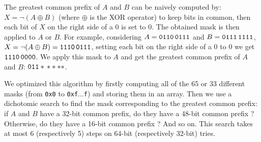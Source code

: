 \documentclass[a4paper,11pt]{article}
\begin{document}
The greatest common prefix of $A$ and $B$ can be naively computed by:
$X = \lnot (A \oplus B)$ (where $\oplus$ is the XOR operator) to keep bits in
common, then each bit of $X$ on the right side of a 0 is set to 0. The obtained
mask is then applied to $A$ or $B$. For example, considering
$A = {\tt 0110\,0111}$ and $B = {\tt 0111\,1111}$,
$X = \lnot (A \oplus B) = {\tt 1110\,0111}$, setting each bit on the right side
of a 0 to 0 we get ${\tt 1110\,0000}$. We apply this mask to $A$ and get the
greatest common prefix of $A$ and $B$: ${\tt 011*\,****}$.


We optimized this algorithm by firstly computing all of the 65 or 33 different
masks (from {\tt 0x0} to {\tt0xf$\dots$f}) and storing them in an array. Then we
use a dichotomic search to find the mask corresponding to the greatest common
prefix: if $A$ and $B$ have a 32-bit common prefix, do they have a 48-bit common
prefix ? Otherwise, do they have a 16-bit common prefix ? And so on. This search
takes at most 6 (respectively 5) steps on 64-bit (respectively 32-bit) tries.




\end{document}
